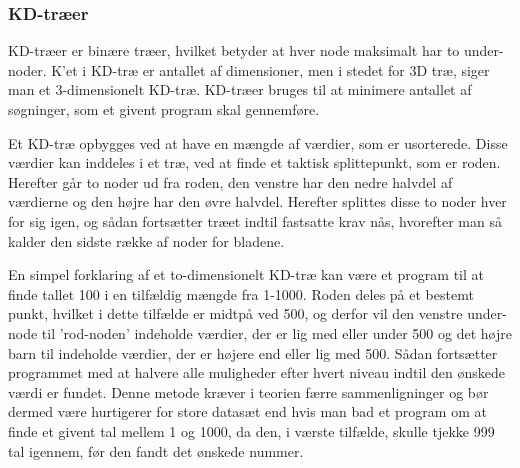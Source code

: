 \subsubsection{KD-træer}
\label{sec:kdtree}

KD-træer er binære træer, hvilket betyder at hver node maksimalt har to under-noder. K'et i KD-træ er antallet af dimensioner, men i stedet for 3D træ, siger man et 3-dimensionelt KD-træ. KD-træer bruges til at minimere antallet af søgninger, som et givent program skal gennemføre. 

Et KD-træ opbygges ved at have en mængde af værdier, som er usorterede. Disse værdier kan inddeles i et træ, ved at finde et taktisk splittepunkt, som er roden. Herefter går to noder ud fra roden, den venstre har den nedre halvdel af værdierne og den højre har den øvre halvdel. Herefter splittes disse to noder hver for sig igen, og sådan fortsætter træet indtil fastsatte krav nås, hvorefter man så kalder den sidste række af noder for bladene. 

En simpel forklaring af et to-dimensionelt KD-træ kan være et program til at finde tallet 100 i en tilfældig mængde fra 1-1000. Roden deles på et bestemt punkt, hvilket i dette tilfælde er midtpå ved 500, og derfor vil den venstre under-node til 'rod-noden' indeholde værdier, der er lig med eller under 500 og det højre barn til indeholde værdier, der er højere end eller lig med 500. Sådan fortsætter programmet med at halvere alle muligheder efter hvert niveau indtil den ønskede værdi er fundet. Denne metode kræver i teorien færre sammenligninger og bør dermed være hurtigerer for store datasæt end hvis man bad et program om at finde et givent tal mellem 1 og 1000, da den, i værste tilfælde, skulle tjekke 999 tal igennem, før den fandt det ønskede nummer.